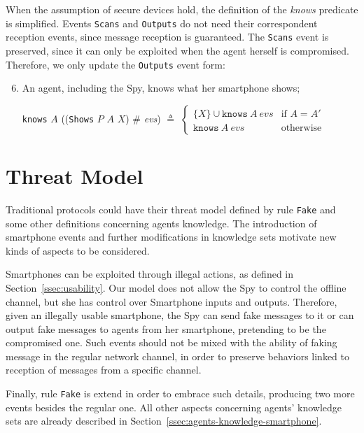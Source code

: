 When the assumption of secure devices hold, the definition of the \textit{knows} predicate is simplified. Events \texttt{Scans} and \texttt{Outputs} do not need their correspondent reception events, since message reception is guaranteed. The \texttt{Scans} event is preserved, since it can only be exploited when the agent herself is compromised. Therefore, we only update the  \texttt{Outputs} event form:
% 
\begin{enumerate}
  \setcounter{enumi}{5}
  \item An agent, including the Spy, knows what her smartphone shows;
  \begin{center}
    \texttt{knows} $A$ ((\texttt{Shows} $P$ $A$ $X$) $\#$ \textit{evs}) $\triangleq$ $\begin{cases}
      \{ X\} \cup \texttt{knows}\ A\ evs & \text{if } A = A'\\
      \texttt{knows}\ A\ evs & \text{otherwise}
    \end{cases}$
  \end{center}
\end{enumerate}



\section{Threat Model}
Traditional protocols could have their threat model defined by rule \texttt{Fake} and some other definitions concerning agents knowledge. The introduction of smartphone events and further modifications in knowledge sets motivate new kinds of aspects to be considered.

Smartphones can be exploited through illegal actions, as defined in Section~\ref{ssec:usability}. Our model does not allow the Spy to control the offline channel, but she has control over Smartphone inputs and outputs. Therefore, given an illegally usable smartphone, the Spy can send fake messages to it or can output fake messages to agents from her smartphone, pretending to be the compromised one. Such events should not be mixed with the ability of faking message in the regular network channel, in order to preserve behaviors linked to reception of messages from a specific channel.

Finally, rule \texttt{Fake} is extend in order to embrace such details, producing two more events besides the regular one. All other aspects concerning agents' knowledge sets are already described in Section~\ref{ssec:agents-knowledge-smartphone}.


